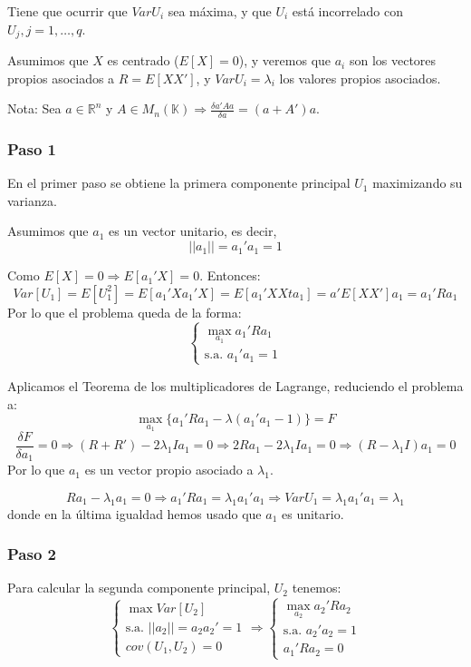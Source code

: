 \documentclass[11pt,a4paper]{article}
\begin{document}
Tiene que ocurrir que $Var U_{i}$ sea máxima, y que $U_{i}$ está incorrelado con $U_{j}, j = 1, \dots, q$.

Asumimos que $X$ es centrado ($E[X] = 0$), y veremos que $a_{i}$ son los vectores propios asociados a $R = E[XX']$, y $Var U_{i} = \lambda_{i}$ los valores propios asociados.

Nota: Sea $a \in \mathbb{R}^{n}$ y $A \in M_{n}(\mathds{K}) \Rightarrow \frac{\delta a'Aa}{\delta a} = (a + A')a$.

\subsubsection{Paso 1}

En el primer paso se obtiene la primera componente principal $U_{1}$ maximizando su varianza.

Asumimos que $a_{1}$ es un vector unitario, es decir,
$$||a_{1}|| = a_{1}'a_{1} = 1$$

Como $E[X] = 0 \Rightarrow E[a_{1}'X] = 0$. Entonces:
$$Var[U_{1}] = E[U_{1}^{2}] = E[a_{1}'Xa_{1}'X] = E[a_{1}'XXta_{1}] = a'E[XX']a_{1} = a_{1}'Ra_{1}$$
Por lo que el problema queda de la forma:
$$\begin{cases}
\max_{a_{1}} a_{1}'Ra_{1} \\
\text{s.a. } a_{1}'a_{1} = 1
\end{cases}$$

Aplicamos el Teorema de los multiplicadores de Lagrange, reduciendo el problema a:
$$\max_{a_{1}} \{a_{1}'Ra_{1} - \lambda(a_{1}'a_{1} - 1)\} = F$$
$$\frac{\delta F}{\delta a_{1}} = 0 \Rightarrow (R+R') - 2 \lambda_{1} I a_{1} = 0 \Rightarrow 2 R a_{1} - 2 \lambda_{1} I a_{1} = 0 \Rightarrow (R - \lambda_{1}I)a_{1} = 0$$
Por lo que $a_{1}$ es un vector propio asociado a $\lambda_{1}$.

$$Ra_{1} - \lambda_{1}a_{1} = 0 \Rightarrow a_{1}'Ra_{1} = \lambda_{1}a_{1}'a_{1} \Rightarrow Var U_{1} = \lambda_{1}a_{1}'a_{1} = \lambda_{1}$$
donde en la última igualdad hemos usado que $a_{1}$ es unitario.

\subsubsection{Paso 2}

Para calcular la segunda componente principal, $U_{2}$ tenemos:
$$\begin{cases}
\max Var[U_{2}] \\
\text{s.a. } ||a_{2}|| = a_{2}a_{2}' = 1 \\
cov(U_{1}, U_{2}) = 0
\end{cases} \Rightarrow \begin{cases}
\max_{a_{2}} a_{2}'Ra_{2} \\
\text{s.a. } a_{2}'a_{2} = 1 \\
a_{1}'Ra_{2} = 0
\end{cases}$$
\end{document}

